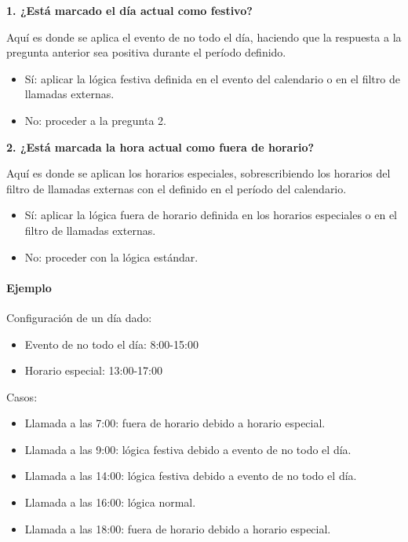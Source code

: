 \documentclass[letterpaper,10pt,spanish]{sphinxmanual}
\begin{document}
\textbf{1. ¿Está marcado el día actual como festivo?}

Aquí es donde se aplica el evento de no todo el día, haciendo que la respuesta a la pregunta anterior sea positiva durante el período definido.
\begin{itemize}
\item {} 
Sí: aplicar la lógica festiva definida en el evento del calendario o en el filtro de llamadas externas.

\item {} 
No: proceder a la pregunta 2.

\end{itemize}

\textbf{2. ¿Está marcada la hora actual como fuera de horario?}

Aquí es donde se aplican los horarios especiales, sobrescribiendo los horarios del filtro de llamadas externas con el definido en el período del calendario.
\begin{itemize}
\item {} 
Sí: aplicar la lógica fuera de horario definida en los horarios especiales o en el filtro de llamadas externas.

\item {} 
No: proceder con la lógica estándar.

\end{itemize}
\paragraph{Ejemplo}

Configuración de un día dado:
\begin{itemize}
\item {} 
Evento de no todo el día: 8:00-15:00

\item {} 
Horario especial: 13:00-17:00

\end{itemize}

Casos:
\begin{itemize}
\item {} 
Llamada a las 7:00: fuera de horario debido a horario especial.

\item {} 
Llamada a las 9:00: lógica festiva debido a evento de no todo el día.

\item {} 
Llamada a las 14:00: lógica festiva debido a evento de no todo el día.

\item {} 
Llamada a las 16:00: lógica normal.

\item {} 
Llamada a las 18:00: fuera de horario debido a horario especial.

\end{itemize}
\end{document}
